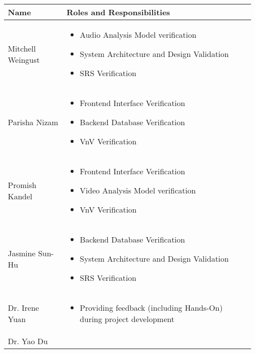 \documentclass[12pt, titlepage]{article}
\begin{document}
\begin{table}[h!]
  \centering
  \begin{tabular}{ | m{5cm} | m{8cm} | }
    \toprule
    Name & Roles and Responsibilities \\
    \hline
    Mitchell Weingust & \vspace{2mm}\begin{itemize}
      \item Audio Analysis Model verification
      \item System Architecture and Design Validation
      \item SRS Verification
    \end{itemize}\\
    \hline
    Parisha Nizam & \vspace{2mm}\begin{itemize}
      \item Frontend Interface Verification
      \item Backend Database Verification
      \item VnV Verification
    \end{itemize}\\
    \hline
    Promish Kandel & \vspace{2mm}\begin{itemize}
      \item Frontend Interface Verification
      \item Video Analysis Model verification
      \item VnV Verification
    \end{itemize}\\
    \hline
    Jasmine Sun-Hu & \vspace{2mm}\begin{itemize}
      \item Backend Database Verification
      \item System Architecture and Design Validation
      \item SRS Verification
    \end{itemize}\\
    \hline
    Dr. Irene Yuan & \vspace{2mm}\begin{itemize}
      \item Providing feedback (including Hands-On) during project development
    \end{itemize}\\
    \hline
    Dr. Yao Du & \vspace{2mm}\begin{itemize}

\end{itemize}
\end{tabular}
\end{table}
\end{document}
